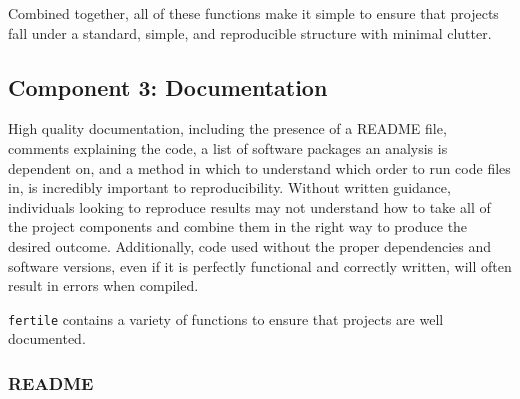 \documentclass[12pt,twoside]{reedthesis}
\begin{document}
Combined together, all of these functions make it simple to ensure that projects fall under a standard, simple, and reproducible structure with minimal clutter.

\hypertarget{component-3-documentation}{%
\subsection{Component 3: Documentation}\label{component-3-documentation}}

High quality documentation, including the presence of a README file, comments explaining the code, a list of software packages an analysis is dependent on, and a method in which to understand which order to run code files in, is incredibly important to reproducibility. Without written guidance, individuals looking to reproduce results may not understand how to take all of the project components and combine them in the right way to produce the desired outcome. Additionally, code used without the proper dependencies and software versions, even if it is perfectly functional and correctly written, will often result in errors when compiled.

\texttt{fertile} contains a variety of functions to ensure that projects are well documented.

\hypertarget{readme}{%
\subsubsection{README}\label{readme}}
\end{document}

